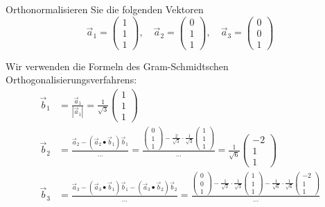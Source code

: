 Orthonormalisieren Sie die folgenden Vektoren
\[
\vec a_1=\begin{pmatrix}1\\1\\1\end{pmatrix},\quad
\vec a_2=\begin{pmatrix}0\\1\\1\end{pmatrix},\quad
\vec a_3=\begin{pmatrix}0\\0\\1\end{pmatrix}
\]


\begin{loesung}
Wir verwenden die Formeln des Gram-Schmidtschen Orthogonalisierungsverfahrens:
\begin{align*}
\vec b_1&=\frac{\vec a_1}{|\vec a_1|}=\frac1{\sqrt{3}}\begin{pmatrix}1\\1\\1\end{pmatrix}
\\
\vec b_2&=\frac{\vec a_2-(\vec a_2\bullet\vec b_1)\vec b_1}{\dots}
=
\frac{\begin{pmatrix}0\\1\\1\end{pmatrix}-\frac{2}{\sqrt{3}}\cdot\frac1{\sqrt{3}}\begin{pmatrix}1\\1\\1\end{pmatrix}}{\dots}
=
\frac1{\sqrt{6}}\begin{pmatrix}-2\\1\\1\end{pmatrix}
\\
\vec b_3
&=
\frac{\vec a_3-(\vec a_3\bullet\vec b_1)\vec b_1-(\vec a_3\bullet\vec b_2)\vec b_2}{\dots}
=
\frac{\begin{pmatrix}0\\0\\1\end{pmatrix}
-\frac1{\sqrt{3}}\cdot\frac1{\sqrt{3}}\begin{pmatrix}1\\1\\1\end{pmatrix}
-\frac1{\sqrt{6}}\cdot\frac1{\sqrt{6}}\begin{pmatrix}-2\\1\\1\end{pmatrix}}{\dots}\\

\end{align*}
\end{loesung}
